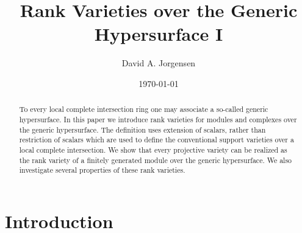 \documentclass{amsart}[11pt]
\numberwithin{equation}{section}
\theoremstyle{plain}
\newtheorem*{Main Theorem}{Main Theorem}
\theoremstyle{definition}
\theoremstyle{remark}
\numberwithin{equation}{theorem}
\begin{document}
\title[Rank Varieties over the Generic Hypersurface I]{Rank Varieties over the Generic Hypersurface I}
\author{David A. Jorgensen}
\address[D. A. Jorgensen]{Department of Mathematics, University of Texas at Arlington, 411 S. Nedderman Drive, Pickard Hall 429, Arlington, TX 76019, USA}

\date{\today}  


\begin{abstract} To every local complete intersection ring one may associate a so-called generic hypersurface. In this paper we introduce rank varieties for modules and complexes over the generic hypersurface. The definition uses extension of scalars, rather than restriction of scalars which are used to define the conventional support varieties over a local complete intersection. We show that every projective variety can be realized as the rank variety of a finitely generated module over the generic hypersurface. We also investigate several properties of these rank varieties.
\end{abstract}

\maketitle

\section{Introduction}\label{sec:1}
\end{document}
